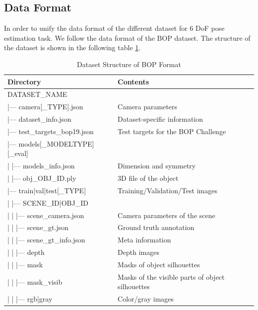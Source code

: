 \documentclass[12pt,DIV14,BCOR12mm,a4paper,footinclude=false,headinclude,parskip=half-,twoside,openright,cleardoublepage=empty,toc=index,bibliography=totoc,listof=totoc]{scrreprt}
\numberwithin{equation}{chapter}
\begin{document}
\subsection{Data Format}
In order to unify the data format of the different dataset for 6 DoF pose estimation task. We follow the data format of the BOP dataset. The structure of the dataset is shown in the following table \ref{tab:dataset}.
\begin{table}[ht]
  \centering
  \caption{Dataset Structure of BOP Format}
  \label{tab:dataset}
  \begin{tabular}{l l}
      \toprule
      Directory & Contents \\
      \midrule
      DATASET\_NAME & \\
      |--- camera[\_TYPE].json & Camera parameters\\
      |--- dataset\_info.json & Dataset-specific information\\
      |--- test\_targets\_bop19.json & Test targets for the BOP Challenge \\
      |--- models[\_MODELTYPE][\_eval] & \\
      | \quad |--- models\_info.json & Dimension and symmetry\\
      | \quad |--- obj\_OBJ\_ID.ply & 3D file of the object\\
      |--- train|val|test[\_TYPE] & Training/Validation/Test images\\
      | \quad |--- SCENE\_ID|OBJ\_ID & \\
      | \quad | \quad |--- scene\_camera.json & Camera parameters of the scene\\
      | \quad | \quad |--- scene\_gt.json & Ground truth annotation\\
      | \quad | \quad |--- scene\_gt\_info.json & Meta information\\
      | \quad | \quad |--- depth & Depth images\\
      | \quad | \quad |--- mask & Masks of object silhouettes\\
      | \quad | \quad |--- mask\_visib & Masks of the visible parts of object silhouettes\\
      | \quad | \quad |--- rgb|gray & Color/gray images\\
      \bottomrule
  \end{tabular}
\end{table}
\end{document}
